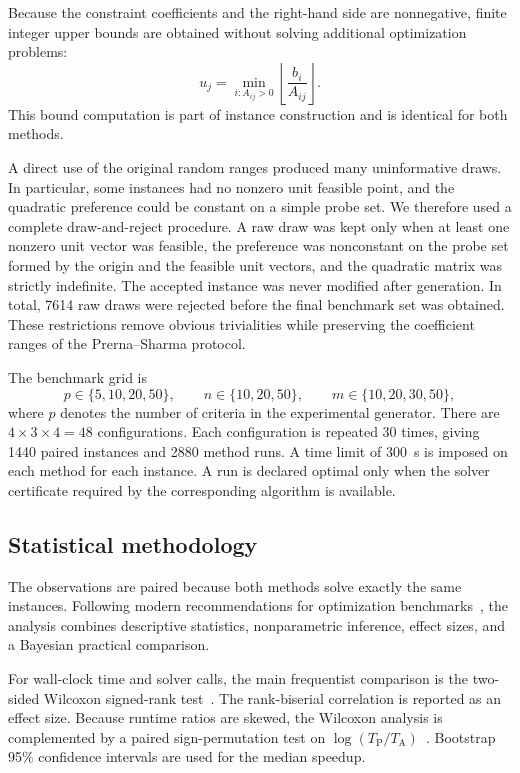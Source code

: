 Because the constraint coefficients and the right-hand side are
nonnegative, finite integer upper bounds are obtained without solving
additional optimization problems:
\[
 u_j=\min_{i:A_{ij}>0}\left\lfloor\frac{b_i}{A_{ij}}\right\rfloor .
\]
This bound computation is part of instance construction and is identical
for both methods.

A direct use of the original random ranges produced many uninformative
draws. In particular, some instances had no nonzero unit feasible point,
and the quadratic preference could be constant on a simple probe set. We
therefore used a complete draw-and-reject procedure. A raw draw was kept
only when at least one nonzero unit vector was feasible, the preference was
nonconstant on the probe set formed by the origin and the feasible unit
vectors, and the quadratic matrix was strictly indefinite. The accepted
instance was never modified after generation. In total, 7614 raw draws
were rejected before the final benchmark set was obtained. These
restrictions remove obvious trivialities while preserving the coefficient
ranges of the Prerna--Sharma protocol.

The benchmark grid is
\[
 p\in\{5,10,20,50\},\qquad
 n\in\{10,20,50\},\qquad
 m\in\{10,20,30,50\},
\]
where $p$ denotes the number of criteria in the experimental generator.
There are $4\times3\times4=48$ configurations. Each configuration is
repeated 30 times, giving 1440 paired instances and 2880 method runs. A
time limit of 300~s is imposed on each method for each instance. A run is
declared optimal only when the solver certificate required by the
corresponding algorithm is available.

\subsection{Statistical methodology}
\label{subsec:statistics}

The observations are paired because both methods solve exactly the same
instances. Following modern recommendations for optimization
benchmarks~\cite{carrasco2020,bartzBeielstein2020}, the analysis combines
descriptive statistics, nonparametric inference, effect sizes, and a
Bayesian practical comparison.

For wall-clock time and solver calls, the main frequentist comparison is
the two-sided Wilcoxon signed-rank test~\cite{wilcoxon1945}. The
rank-biserial correlation is reported as an effect size. Because runtime
ratios are skewed, the Wilcoxon analysis is complemented by a paired
sign-permutation test on
$\log(T_{\mathrm{P}}/T_{\mathrm{A}})$~\cite{pesarin2001}. Bootstrap
95\% confidence intervals are used for the median speedup.

